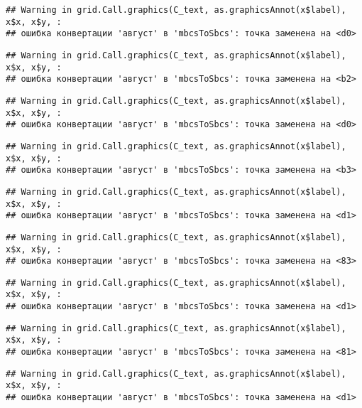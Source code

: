 \documentclass[
]{article}
\begin{document}
\begin{verbatim}
## Warning in grid.Call.graphics(C_text, as.graphicsAnnot(x$label), x$x, x$y, :
## ошибка конвертации 'август' в 'mbcsToSbcs': точка заменена на <d0>
\end{verbatim}

\begin{verbatim}
## Warning in grid.Call.graphics(C_text, as.graphicsAnnot(x$label), x$x, x$y, :
## ошибка конвертации 'август' в 'mbcsToSbcs': точка заменена на <b2>
\end{verbatim}

\begin{verbatim}
## Warning in grid.Call.graphics(C_text, as.graphicsAnnot(x$label), x$x, x$y, :
## ошибка конвертации 'август' в 'mbcsToSbcs': точка заменена на <d0>
\end{verbatim}

\begin{verbatim}
## Warning in grid.Call.graphics(C_text, as.graphicsAnnot(x$label), x$x, x$y, :
## ошибка конвертации 'август' в 'mbcsToSbcs': точка заменена на <b3>
\end{verbatim}

\begin{verbatim}
## Warning in grid.Call.graphics(C_text, as.graphicsAnnot(x$label), x$x, x$y, :
## ошибка конвертации 'август' в 'mbcsToSbcs': точка заменена на <d1>
\end{verbatim}

\begin{verbatim}
## Warning in grid.Call.graphics(C_text, as.graphicsAnnot(x$label), x$x, x$y, :
## ошибка конвертации 'август' в 'mbcsToSbcs': точка заменена на <83>
\end{verbatim}

\begin{verbatim}
## Warning in grid.Call.graphics(C_text, as.graphicsAnnot(x$label), x$x, x$y, :
## ошибка конвертации 'август' в 'mbcsToSbcs': точка заменена на <d1>
\end{verbatim}

\begin{verbatim}
## Warning in grid.Call.graphics(C_text, as.graphicsAnnot(x$label), x$x, x$y, :
## ошибка конвертации 'август' в 'mbcsToSbcs': точка заменена на <81>
\end{verbatim}

\begin{verbatim}
## Warning in grid.Call.graphics(C_text, as.graphicsAnnot(x$label), x$x, x$y, :
## ошибка конвертации 'август' в 'mbcsToSbcs': точка заменена на <d1>
\end{verbatim}
\end{document}

